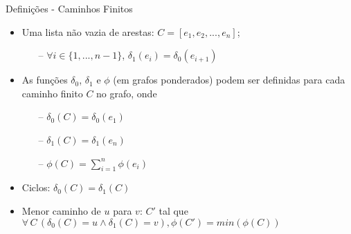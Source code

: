 \begin{frame}{Definições - Caminhos Finitos}
    \begin{itemize}
        \item Uma lista não vazia de arestas: $C = [e_1,e_2, ..., e_n]$;
        \begin{itemize}
            \item[--] $\forall i \in \{1, ..., n-1\}$, $\delta_1(e_i) = \delta_0(e_{i+1})$
        \end{itemize}
        \item As funções $\delta_0$, $\delta_1$ e $\phi$ (em grafos ponderados) podem ser definidas para cada caminho finito $C$ no grafo, onde
        \begin{itemize}
            \item[--] $\delta_0(C) = \delta_0(e_1)$
            \item[--] $\delta_1(C) = \delta_1(e_n)$
            \item[--] $\phi(C) = \sum_{i=1}^{n} \phi(e_i)$
        \end{itemize}
        \item Ciclos: $\delta_0(C) = \delta_1(C)$
        \item Menor caminho de $u$ para $v$: $C'$ tal que $\forall\,C\,(\delta_0(C) = u \land \delta_1(C) = v), \phi(C') = min(\phi(C))$
    \end{itemize}
\end{frame}